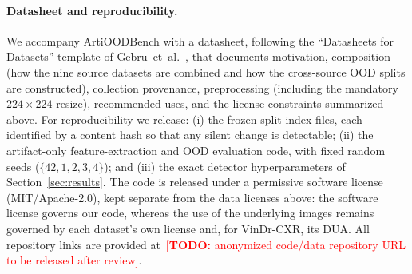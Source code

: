 \documentclass{article}
\providecommand{\todo}[1]{\textcolor{red}{[\textbf{TODO:} #1]}}
\begin{document}
\paragraph{Datasheet and reproducibility.} We accompany ArtiOODBench with a
datasheet, following the ``Datasheets for Datasets'' template of
Gebru~et~al.~\citep{gebru2021datasheets}, that documents motivation, composition
(how the nine source datasets are combined and how the cross-source OOD splits
are constructed), collection provenance, preprocessing (including the mandatory
$224\times224$ resize), recommended uses, and the license constraints summarized
above. For reproducibility we release: (i) the frozen split index files, each
identified by a content hash so that any silent change is detectable; (ii) the
artifact-only feature-extraction and OOD evaluation code, with fixed random seeds
($\{42, 1, 2, 3, 4\}$); and (iii) the exact detector hyperparameters of
Section~\ref{sec:results}. The code is released under a permissive software
license (MIT/Apache-2.0), kept separate from the data licenses above: the
software license governs our code, whereas the use of the underlying images
remains governed by each dataset's own license and, for VinDr-CXR, its DUA. All
repository links are provided at~\todo{anonymized code/data repository URL to be
released after review}.



\end{document}

